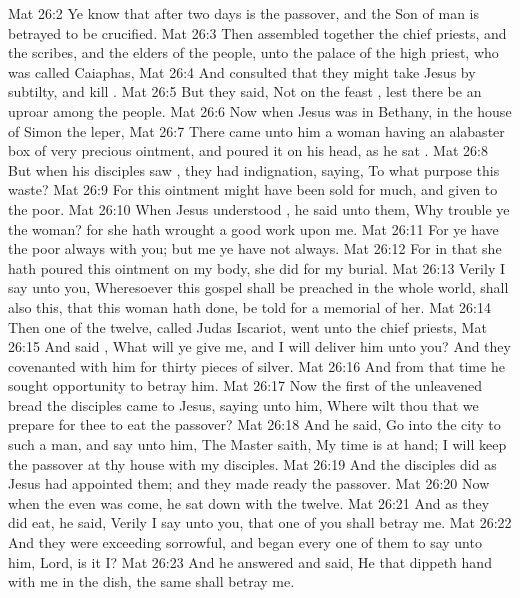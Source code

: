 \vs Mat 26:2 Ye know that after two days is  the passover, and the Son of man is betrayed to be crucified.
\vs Mat 26:3 Then assembled together the chief priests, and the scribes, and the elders of the people, unto the palace of the high priest, who was called Caiaphas,
\vs Mat 26:4 And consulted that they might take Jesus by subtilty, and kill .
\vs Mat 26:5 But they said, Not on the feast , lest there be an uproar among the people.
\vs Mat 26:6 Now when Jesus was in Bethany, in the house of Simon the leper,
\vs Mat 26:7 There came unto him a woman having an alabaster box of very precious ointment, and poured it on his head, as he sat .
\vs Mat 26:8 But when his disciples saw , they had indignation, saying, To what purpose  this waste?
\vs Mat 26:9 For this ointment might have been sold for much, and given to the poor.
\vs Mat 26:10 When Jesus understood , he said unto them, Why trouble ye the woman? for she hath wrought a good work upon me.
\vs Mat 26:11 For ye have the poor always with you; but me ye have not always.
\vs Mat 26:12 For in that she hath poured this ointment on my body, she did  for my burial.
\vs Mat 26:13 Verily I say unto you, Wheresoever this gospel shall be preached in the whole world,  shall also this, that this woman hath done, be told for a memorial of her.
\vs Mat 26:14 Then one of the twelve, called Judas Iscariot, went unto the chief priests,
\vs Mat 26:15 And said , What will ye give me, and I will deliver him unto you? And they covenanted with him for thirty pieces of silver.
\vs Mat 26:16 And from that time he sought opportunity to betray him.
\vs Mat 26:17 Now the first  of the  unleavened bread the disciples came to Jesus, saying unto him, Where wilt thou that we prepare for thee to eat the passover?
\vs Mat 26:18 And he said, Go into the city to such a man, and say unto him, The Master saith, My time is at hand; I will keep the passover at thy house with my disciples.
\vs Mat 26:19 And the disciples did as Jesus had appointed them; and they made ready the passover.
\vs Mat 26:20 Now when the even was come, he sat down with the twelve.
\vs Mat 26:21 And as they did eat, he said, Verily I say unto you, that one of you shall betray me.
\vs Mat 26:22 And they were exceeding sorrowful, and began every one of them to say unto him, Lord, is it I?
\vs Mat 26:23 And he answered and said, He that dippeth  hand with me in the dish, the same shall betray me.
